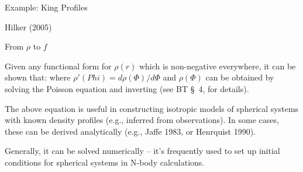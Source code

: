 \documentclass[letterpaper,landscape]{slides}
\begin{document}
\begin{slide}
\begin{center}
{\large \color{red} 
                  Example: King Profiles  }
\end{center}

\begin{center}
\vskip -0.0in
\end{center}

\begin{flushright}
Hilker (2005)
\end{flushright}

\vfill
\end{slide}


\begin{slide}
\begin{center}
{\large \color{red} 
                  From $\rho$ to $f$  }
\end{center}

Given any functional form for $\rho(r)$ which is non-negative everywhere, it can be shown
that:
where $\rho'(Phi) = d\rho(\Phi)/d\Phi$ and $\rho(\Phi)$ can be obtained by solving
the Poisson equation and inverting (see BT \S~4, for details).

The above equation is useful in constructing isotropic models of spherical systems with
known density profiles (e.g., inferred from observations). In some cases,
these can be derived analytically (e.g., Jaffe 1983, or Henrquist 1990).

Generally, it can be solved numerically -- it's frequently used to set up
initial conditions for spherical systems in N-body calculations.

\vfill
\end{slide}
\end{document}
